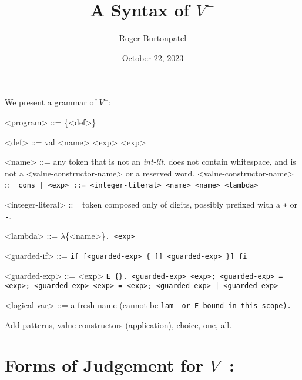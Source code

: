 \documentclass[]{article}
\title{A Syntax of $V^{-}$}
\author{Roger Burtonpatel}
\date{October 22, 2023}
\begin{document}
\maketitle

We present a grammar of $V^{-}$: 

\bigskip


\begin{grammar}
    <program> ::= \{<def>\}
    
    <def> ::= val <name> <exp>
        \alt <exp>
    
    <name> ::= any token that is not an \textit{int-lit}, does not contain 
    whitespace,
    and is not a <value-constructor-name> or a reserved word.
    <value-constructor-name> ::= \tt{cons} | 
    <exp> ::= <integer-literal>
        \alt <name>
        \alt <name>
        \alt <lambda>

    <integer-literal> ::= token composed only of digits, possibly prefixed with a \texttt{+} or \texttt{-}.

    <lambda> ::= $\lambda$\{<name>\}\tt{.} <exp>

    <guarded-if> ::= \tt{if}  [<guarded-exp> \{ [] <guarded-exp> \}] \tt{fi}


    <guarded-exp> ::= <exp>
    \alt  \tt{E} \{<logical-var>\}\tt{.} <guarded-exp>
    \alt  <exp>\tt{;} <guarded-exp>
     \tt{=} <exp>\tt{;} <guarded-exp>
    \alt   <exp> \tt{=} <exp>\tt{;} <guarded-exp>
     | <guarded-exp>

    <logical-var> ::= a fresh name (cannot be \tt{lam}- or \tt{E}-bound in
    this scope).

\end{grammar}

Add patterns, value constructors (application), choice, one, all. 




    
    
    \section{Forms of Judgement for $V^{-}$:}
    
\end{document}
